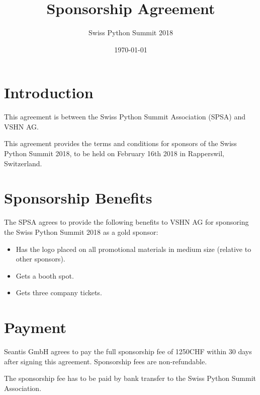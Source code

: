\documentclass[11pt,enlargefirstpage=true,headlines=4]{scrartcl}
\title{Sponsorship Agreement}
\subtitle{Swiss Python Summit 2018}
\date{\today} %
\begin{document}
    \maketitle

    \section{Introduction}

    This agreement is between the Swiss Python Summit Association (SPSA) and
    VSHN AG.

    This agreement provides the terms and conditions for sponsors of the Swiss
    Python Summit 2018, to be held on February 16th 2018 in Rapperswil,
    Switzerland.

    \section{Sponsorship Benefits}

    The SPSA agrees to provide the following benefits to VSHN AG for sponsoring
    the Swiss Python Summit 2018 as a gold sponsor:

    \begin{itemize}
        \item Has the logo placed on all promotional materials in medium size (relative to other sponsors).
        \item Gets a booth spot.
        \item Gets three company tickets.
    \end{itemize}

    \section{Payment}

    Seantis GmbH agrees to pay the full sponsorship fee of 1250CHF within 30 days
    after signing this agreement. Sponsorship fees are non‐refundable.

    The sponsorship fee has to be paid by bank transfer to the Swiss Python
    Summit Association.

    \quad
\end{document}
